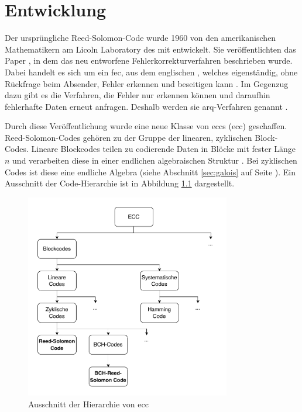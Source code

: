 \chapter{Entwicklung}\label{ch:development}

Der ursprüngliche Reed-Solomon-Code wurde 1960 von den amerikanischen Mathematikern am Licoln Laboratory des \acrshort{mit} entwickelt.
Sie veröffentlichten das Paper , in dem das neu entworfene Fehlerkorrekturverfahren beschrieben wurde.
Dabei handelt es sich um ein \acrfull{fec}, aus dem englischen , welches eigenständig, ohne Rückfrage beim Absender, Fehler erkennen und beseitigen kann \cite{wickerReedSolomonCodes1994}.
Im Gegenzug dazu gibt es die Verfahren, die Fehler nur erkennen können und daraufhin fehlerhafte Daten erneut anfragen. Deshalb werden sie \acrfull{arq}-Verfahren genannt \cite{friedrichsKanalcodierung1996, geiselTutorialReedSolomonError1990}.

Durch diese Veröffentlichung wurde eine neue Klasse von \acrlong{ecc}s (\acrshort{ecc}) geschaffen. 
Reed-Solomon-Codes gehören zu der Gruppe der linearen, zyklischen Block-Codes. 
Lineare Blockcodes teilen zu codierende Daten in Blöcke mit fester Länge \(n\) und verarbeiten diese in einer endlichen algebraischen Struktur \cite{friedrichsKanalcodierung1996}. 
Bei zyklischen Codes ist diese eine endliche Algebra (siehe Abschnitt \ref{sec:galois} auf Seite \pageref{sec:galois}).
Ein Ausschnitt der Code-Hierarchie ist in Abbildung \ref{fig:eccHierarchy} dargestellt.

\begin{figure}[ht]
	\centering
	\includegraphics[width=0.8\textwidth]{figures/Codeklassen.drawio.pdf}
	\caption{Ausschnitt der Hierarchie von \acrshort{ecc}}
	\label{fig:eccHierarchy}
\end{figure}

